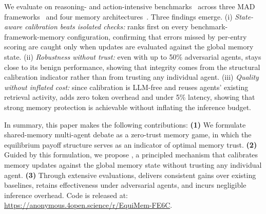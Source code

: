 We evaluate \system on reasoning- and action-intensive benchmarks~\citep{maharana2024evaluating,shridhar2020alfworld,yang2018hotpotqa,yao2022webshop} across three MAD frameworks~\citep{liu2023dynamic,qian2024scaling,wu2024autogen} and four memory architectures~\citep{anokhin2024arigraph,wang2023voyager,zhang2025g,zhong2024memorybank}. Three findings emerge. (i) \emph{State-aware calibration beats isolated checks:} \system ranks first on every benchmark-framework-memory configuration, confirming that errors missed by per-entry scoring are caught only when updates are evaluated against the global memory state. (ii) \emph{Robustness without trust:} even with up to 50\% adversarial agents, \system stays close to its benign performance, showing that integrity comes from the structural calibration indicator rather than from trusting any individual agent. (iii) \emph{Quality without inflated cost:} since calibration is LLM-free and reuses agents' existing retrieval activity, \system adds zero token overhead and under 5\% latency, showing that strong memory protection is achievable without inflating the inference budget.

In summary, this paper makes the following contributions: \textbf{(1) }We formulate shared-memory multi-agent debate as a zero-trust memory game, in which the equilibrium payoff structure serves as an indicator of optimal memory trust.\textbf{ (2)} Guided by this formulation, we propose \system, a principled mechanism that calibrates memory updates against the global memory state without trusting any individual agent. \textbf{(3) } Through extensive evaluations, \system delivers consistent gains over existing baselines, retains effectiveness under adversarial agents, and incurs negligible inference overhead. Code is released at: \url{https://anonymous.4open.science/r/EquiMem-FE6C}.